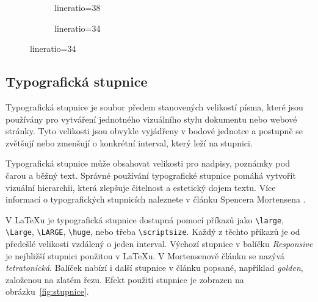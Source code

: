 \documentclass{csbulletin}
\newcommand\balicek[1]{\textit{#1}}
\begin{document}
\begin{figure}[tbp]
  \caption{Změna řádkového prokladu změnou hodnoty \texttt{lineratio}}
  \label{fig:lineratio}
  \begin{subfigure}[b]{0.45\textwidth}
\caption{lineratio=38}
\end{subfigure}
\begin{subfigure}[b]{0.45\textwidth}
\caption{lineratio=34}
\end{subfigure}
\end{figure}

\subsection{Typografická stupnice}

Typografická stupnice je soubor předem stanovených velikostí písma, které jsou
používány pro vytváření jednotného vizuálního stylu dokumentu nebo webové
stránky. Tyto velikosti jsou obvykle vyjádřeny v bodové jednotce a postupně se
zvětšují nebo zmenšují o konkrétní interval, který leží na stupnici.

Typografická stupnice může obsahovat velikosti pro nadpisy, poznámky pod čarou a běžný
text. Správné používání typografické stupnice pomáhá vytvořit vizuální
hierarchii, která zlepšuje čitelnost a estetický dojem textu. 
Více informací o typografických stupnicích naleznete v článku Spencera Mortensena
\cite{mortensen}. 

V \LaTeX u je typografická stupnice dostupná pomocí příkazů jako \verb|\large|, \verb|\Large|, \verb|\LARGE|,
\verb|\huge|, nebo třeba \verb|\scriptsize|. Každý z těchto příkazů je od předešlé velikosti 
vzdálený o jeden interval.  Výchozí stupnice v balíčku \balicek{Responsive} je nejbližší stupnici použitou v \LaTeX u.
V Mortensenově článku se nazývá \textit{tetratonická}. Balíček nabízí i další stupnice v článku popsané,
například \textit{golden}, založenou na zlatém řezu. Efekt použití stupnice je zobrazen na 
obrázku~\ref{fig:stupnice}.
\end{document}
